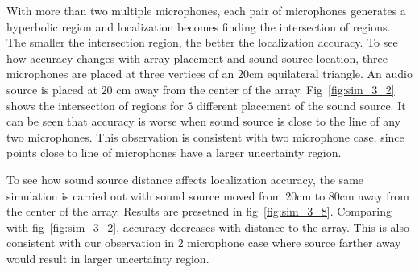 With more than two multiple microphones, each pair of microphones generates a hyperbolic region and localization becomes finding the intersection of regions. The smaller the intersection region, the better the localization accuracy. To see how accuracy changes with array placement and sound source location, three microphones are placed at three vertices of an $20$cm equilateral triangle. An audio source is placed at $20$ cm away from the center of the array. Fig~\ref{fig:sim_3_2} shows the intersection of regions for $5$ different placement of the sound source. It can be seen that accuracy is worse when sound source is close to the line of any two microphones. This observation is consistent with two microphone case, since points close to line of microphones have a larger uncertainty region.

To see how sound source distance affects localization accuracy, the same simulation is carried out with sound source moved from $20$cm to $80$cm away from the center of the array. Results are presetned in fig~\ref{fig:sim_3_8}. Comparing with fig~\ref{fig:sim_3_2}, accuracy decreases with distance to the array. This is also consistent with our observation in $2$ microphone case where source farther away would result in larger uncertainty region.

